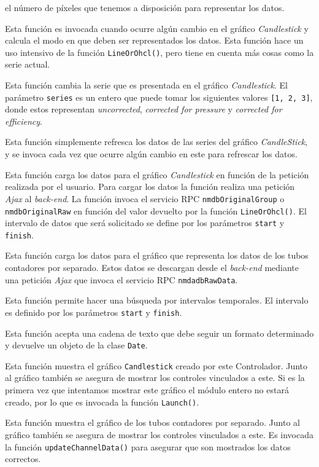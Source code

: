 \begin{description}[style=unboxed,leftmargin=0cm]
			  el número de píxeles que tenemos a disposición para representar los datos.
			\item[\texttt{updateMode(start, finish)}] Esta función es invocada cuando ocurre algún cambio en el gráfico \emph{Candlestick}
			  y calcula el modo en que deben ser representados los datos. Esta función hace un uso intensivo de la función
			  \texttt{LineOrOhcl()}, pero tiene en cuenta más cosas como la serie actual.
			\item[\texttt{changeSeries(series)}] Esta función cambia la serie que es presentada en el gráfico \emph{Candlestick}. El
			  parámetro \texttt{series} es un entero que puede tomar los siguientes valores \texttt{[1, 2, 3]}, donde estos representan
			  \emph{uncorrected}, \emph{corrected for pressure} y \emph{corrected for efficiency}.
			\item[\texttt{updateSeries()}] Esta función simplemente refresca los datos de las series del gráfico \emph{CandleStick}, y se
			  invoca cada vez que ocurre algún cambio en este para refrescar los datos.
			\item[\texttt{updateCandleData(start, finish)}] Esta función carga los datos para el gráfico \emph{Candlestick} en función de
			  la petición realizada por el usuario. Para cargar los datos la función realiza una petición \emph{Ajax} al \emph{back-end}. La
			  función invoca el servicio RPC \texttt{nmdbOriginalGroup} o \texttt{nmdbOriginalRaw} en función del valor devuelto por la
			  función \texttt{LineOrOhcl()}. El intervalo de datos que será solicitado se define por los parámetros \texttt{start} y
			  \texttt{finish}. 
			\item[\texttt{updateChannelData()}] Esta función carga los datos para el gráfico que representa los datos de los tubos
			  contadores por separado. Estos datos se descargan desde el \emph{back-end} mediante una petición \emph{Ajax} que invoca el servicio
			  RPC \texttt{nmdadbRawData}.
			\item[\texttt{searchInterval(start, finish)}] Esta función permite hacer una búsqueda por intervalos temporales. El intervalo
			  es definido por los parámetros \texttt{start} y \texttt{finish}.
			\item[\texttt{getTimestamp(str)}] Esta función acepta una cadena de texto que debe seguir un formato determinado y devuelve un
			  objeto de la clase \texttt{Date}. 
			\item[\texttt{showCandle()}] Esta función muestra el gráfico \texttt{Candlestick} creado por este Controlador. Junto al
			  gráfico también se asegura de mostrar los controles vinculados a este. Si es la primera vez que intentamos mostrar este
			  gráfico el módulo entero no estará creado, por lo que es invocada la función \texttt{Launch()}.
			\item[\texttt{showChannel()}] Esta función muestra el gráfico de los tubos contadores por separado. Junto al gráfico también
			  se asegura de mostrar los controles vinculados a este. Es invocada la función \texttt{updateChannelData()} para asegurar que
			  son mostrados los datos correctos.
		\end{description}
